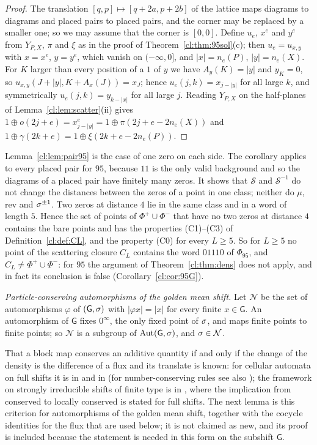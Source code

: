 \begin{proof}
The translation $[q,p]\mapsto[q+2a,p+2b]$ of the lattice maps diagrams to diagrams and placed pairs to placed pairs, and the corner may be replaced by a smaller one; so we may assume that the corner is $[0,0]$. Define $u_e$, $x^e$ and $y^e$ from $Y_{P,X}$, $\pi$ and $\xi$ as in the proof of Theorem~\ref{cl:thm:95sol}(c); then $u_e=u_{x,y}$ with $x=x^e$, $y=y^e$, which vanish on $(-\infty,0]$, and $|x|=n_e(P)$, $|y|=n_e(X)$. For $K$ larger than every position of a $1$ of $y$ we have $A_y(K)=|y|$ and $y_K=0$, so $u_{x,y}(J+|y|,K+A_x(J))=x_J$; hence $u_e(j,k)=x_{j-|y|}$ for all large $k$, and symmetrically $u_e(j,k)=y_{k-|x|}$ for all large $j$. Reading $Y_{P,X}$ on the half-planes of Lemma~\ref{cl:lem:scatter}(ii) gives $1\oplus o(2j+e)=x^e_{j-|y|}=1\oplus\pi(2j+e-2n_e(X))$ and $1\oplus\gamma(2k+e)=1\oplus\xi(2k+e-2n_e(P))$.
\end{proof}

Lemma~\ref{cl:lem:pair95} is the case of one zero on each side. The corollary applies to every placed pair for $95$, because $11$ is the only valid background and so the diagrams of a placed pair have finitely many zeros. It shows that $\mathcal S$ and $\mathcal S^{-1}$ do not change the distances between the zeros of a point in one class; neither do $\mu$, $\mathrm{rev}$ and $\sigma^{\pm1}$. Two zeros at distance $4$ lie in the same class and in a word of length $5$. Hence the set of points of $\Phi^+\cup\Phi^-$ that have no two zeros at distance $4$ contains the bare points and has the properties (C1)--(C3) of Definition~\ref{cl:def:CL}, and the property (C0) for every $L\ge5$. So for $L\ge5$ no point of the scattering closure $C_L$ contains the word $01110$ of $\Phi_{95}$, and $C_L\ne\Phi^+\cup\Phi^-$: for $95$ the argument of Theorem~\ref{cl:thm:dens} does not apply, and in fact its conclusion is false (Corollary~\ref{cl:cor:95G}).

\emph{Particle-conserving automorphisms of the golden mean shift.} Let $\mathcal N$ be the set of automorphisms $\varphi$ of $(\mathsf G,\sigma)$ with $|\varphi x|=|x|$ for every finite $x\in \mathsf G$. An automorphism of $\mathsf G$ fixes $0^\infty$, the only fixed point of $\sigma$, and maps finite points to finite points; so $\mathcal N$ is a subgroup of $\operatorname{Aut}(\mathsf G,\sigma)$, and $\sigma\in\mathcal N$.

That a block map conserves an additive quantity if and only if the change of the density is the difference of a flux and its translate is known: for cellular automata on full shifts it is in \cite[Theorems~2.1, 2.2, 2.6 and~2.7]{HT1991} and in \cite{Pivato2002,MBG2004} (for number-conserving rules see also \cite{BF1998}); the framework on strongly irreducible shifts of finite type is in \cite[Section~4.1]{KT2015}, where the implication from conserved to locally conserved is stated for full shifts. The next lemma is this criterion for automorphisms of the golden mean shift, together with the cocycle identities for the flux that are used below; it is not claimed as new, and its proof is included because the statement is needed in this form on the subshift $\mathsf G$.

